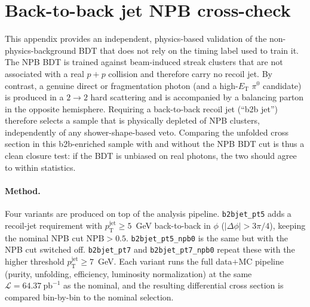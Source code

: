 \documentclass[11pt]{article}
\newcommand{\ET}{E_{\mathrm{T}}}
\begin{document}
\section{Back-to-back jet NPB cross-check}
\label{app:b2b}
This appendix provides an independent, physics-based validation of the
non-physics-background BDT that does not rely on the timing label used to train
it. The NPB BDT is trained against beam-induced streak clusters that are not
associated with a real $p+p$ collision and therefore carry no recoil jet. By
contrast, a genuine direct or fragmentation photon (and a high-$\ET$ $\pi^0$
candidate) is produced in a $2\to2$ hard scattering and is accompanied by a
balancing parton in the opposite hemisphere. Requiring a back-to-back recoil jet
(``b2b jet'') therefore selects a sample that is physically depleted of NPB
clusters, independently of any shower-shape-based veto. Comparing the unfolded
cross section in this b2b-enriched sample with and without the NPB BDT cut is thus
a clean closure test: if the BDT is unbiased on real photons, the two should agree
to within statistics.

\paragraph{Method.} Four variants are produced on top of the analysis pipeline.
\texttt{b2bjet\_pt5} adds a recoil-jet requirement with $p_{\mathrm{T}}^{\mathrm{jet}}\ge5$~GeV
back-to-back in $\phi$ ($|\Delta\phi|>3\pi/4$), keeping the nominal NPB cut
$\mathrm{NPB}>0.5$. \texttt{b2bjet\_pt5\_npb0} is the same but with the NPB cut
switched off. \texttt{b2bjet\_pt7} and \texttt{b2bjet\_pt7\_npb0} repeat these with
the higher threshold $p_{\mathrm{T}}^{\mathrm{jet}}\ge7$~GeV. Each variant runs the
full data$+$MC pipeline (purity, unfolding, efficiency, luminosity normalization)
at the same $\mathcal{L}=64.37~\mathrm{pb}^{-1}$ as the nominal, and the resulting
differential cross section is compared bin-by-bin to the nominal selection.
\end{document}
